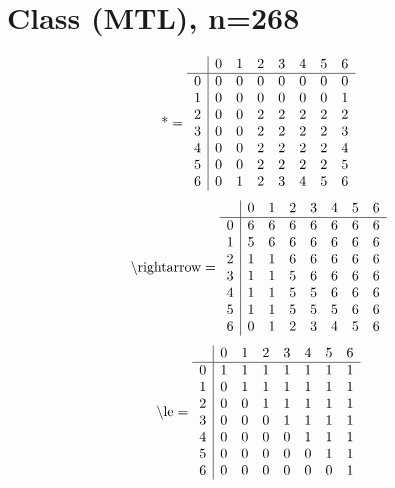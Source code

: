 \documentclass[11pt]{article}
\begin{document}
\section{Class (MTL), n=268}
\[\text{*} = 
\begin{array}{r | r r r r r r r}
 & 0 & 1 & 2 & 3 & 4 & 5 & 6 \\ \hline
0 & 0 & 0 & 0 & 0 & 0 & 0 & 0 \\
1 & 0 & 0 & 0 & 0 & 0 & 0 & 1 \\
2 & 0 & 0 & 2 & 2 & 2 & 2 & 2 \\
3 & 0 & 0 & 2 & 2 & 2 & 2 & 3 \\
4 & 0 & 0 & 2 & 2 & 2 & 2 & 4 \\
5 & 0 & 0 & 2 & 2 & 2 & 2 & 5 \\
6 & 0 & 1 & 2 & 3 & 4 & 5 & 6 \\
\end{array}
\]
\[\text{\textbackslash rightarrow} = 
\begin{array}{r | r r r r r r r}
 & 0 & 1 & 2 & 3 & 4 & 5 & 6 \\ \hline
0 & 6 & 6 & 6 & 6 & 6 & 6 & 6 \\
1 & 5 & 6 & 6 & 6 & 6 & 6 & 6 \\
2 & 1 & 1 & 6 & 6 & 6 & 6 & 6 \\
3 & 1 & 1 & 5 & 6 & 6 & 6 & 6 \\
4 & 1 & 1 & 5 & 5 & 6 & 6 & 6 \\
5 & 1 & 1 & 5 & 5 & 5 & 6 & 6 \\
6 & 0 & 1 & 2 & 3 & 4 & 5 & 6 \\
\end{array}
\]
\[\text{\textbackslash le} = 
\begin{array}{r | r r r r r r r}
 & 0 & 1 & 2 & 3 & 4 & 5 & 6 \\ \hline
0 & 1 & 1 & 1 & 1 & 1 & 1 & 1 \\
1 & 0 & 1 & 1 & 1 & 1 & 1 & 1 \\
2 & 0 & 0 & 1 & 1 & 1 & 1 & 1 \\
3 & 0 & 0 & 0 & 1 & 1 & 1 & 1 \\
4 & 0 & 0 & 0 & 0 & 1 & 1 & 1 \\
5 & 0 & 0 & 0 & 0 & 0 & 1 & 1 \\
6 & 0 & 0 & 0 & 0 & 0 & 0 & 1 \\
\end{array}
\]
\end{document}
